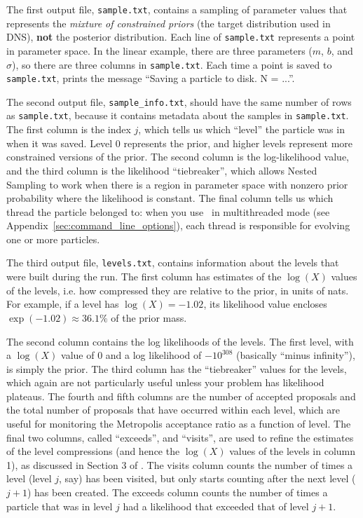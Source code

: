 \documentclass[article, nojss]{jss}
\newcommand{\dnest}{\pkg{DNest4}}
\begin{document}
The first output
file, {\tt sample.txt}, contains a sampling of parameter values that
represents the {\it mixture of constrained priors} (the target distribution
used in DNS), {\bf not} the
posterior distribution. Each line of {\tt sample.txt} represents a point in
parameter space. In the linear example, there are three parameters
($m$, $b$, and $\sigma$), so there
are three columns in {\tt sample.txt}.
Each time a point is saved to {\tt sample.txt},  prints
the message ``Saving a particle to disk. N = ...''.

The second output file, {\tt sample\_info.txt}, should have the same number of
rows as {\tt sample.txt}, because it contains metadata about the samples in
{\tt sample.txt}. The first
column is the index $j$, which tells us which ``level'' the particle was in
when it was saved. Level 0 represents the prior, and higher levels represent
more constrained versions of the prior.
The second column is the log-likelihood value, and the third column is
the likelihood ``tiebreaker'', which allows Nested Sampling to work when
there is a region in parameter space with nonzero prior probability where the
likelihood is constant. The final column tells us which thread the particle
belonged to: when you use \dnest~in multithreaded mode
(see Appendix~\ref{sec:command_line_options}), each thread
is responsible for evolving one or more particles.

The third output file, {\tt levels.txt}, contains information about the levels
that were built during the run. The first column has estimates of the $\log(X)$
values of the levels, i.e. how compressed they are relative to the prior, in
units of nats. For example, if a level has $\log(X) = -1.02$, its likelihood
value encloses $\exp(-1.02) \approx 36.1\%$ of the prior mass.

The second column contains the log likelihoods of the levels.
The first level, with a $\log(X)$ value of 0 and a log likelihood of
$-10^{308}$ (basically ``minus infinity''), is simply the prior. The third
column has the ``tiebreaker'' values for the levels, which again are not
particularly useful unless your problem has likelihood plateaus. The fourth
and fifth columns are the number of accepted proposals and the total number
of proposals that have occurred within each level, which are useful for
monitoring the Metropolis acceptance ratio as a function of level.
The final two columns, called ``exceeds'', and ``visits'', are used to refine
the estimates of the level compressions (and hence the $\log(X)$ values of
the levels in column 1), as discussed in Section 3 of
\citet{brewer2011diffusive}.
The visits column counts the number of times a level (level $j$, say)
has been visited, but only starts counting after the next level ($j+1$) has been created. The exceeds column counts the number of times a particle that was
in level $j$ had a likelihood that exceeded that of level $j+1$.
\end{document}
